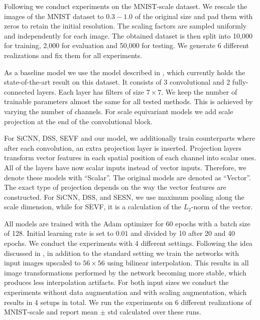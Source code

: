 \documentclass{article} \usepackage{multirow}
\begin{document}
Following \citet{kanazawa2014locally,marcos2018scale,ghosh2019scale} 
we conduct experiments on the MNIST-scale dataset. 
We rescale the images of the MNIST dataset \citet{lecun1998gradient}
to $0.3-1.0$ of the original size and pad them with zeros to retain the initial resolution. 
The scaling factors are sampled uniformly and independently for each image. 
The obtained dataset is then split into 10,000 for training,
2,000 for evaluation and 50,000 for testing. 
We generate 6 different realizations and fix them for all experiments.

As a baseline model we use the model described in \citet{ghosh2019scale},
which currently holds the state-of-the-art result on this dataset. It consists of 
3 convolutional and 2 fully-connected layers. 
Each layer has filters of size $7\times7$. 
We keep the number of trainable parameters almost the same for 
all tested methods. This is achieved by varying the number of channels. For scale equivariant models we add
scale projection at the end of the convolutional block. 

For SiCNN, DSS, SEVF and our model, we additionally train counterparts where after 
each convolution, an extra projection layer is inserted.
Projection layers transform vector features in each spatial position of each channel into scalar ones. All of the layers have now scalar inputs instead of vector inputs. Therefore, we denote these models with ``Scalar''. 
The original models are denoted as ``Vector''. The exact type of projection depends on the way the  
vector features are constructed. For SiCNN, DSS, and SESN, we use maximum pooling along 
the scale dimension, 
while for SEVF, it is a calculation of the $L_2$-norm of the vector. 

All models are trained with the Adam optimizer \citet{kingma2014adam} for 60 epochs with a batch size of 128. 
Initial learning rate is set to $0.01$ and divided by 10 after 20 and 40 epochs. 
We conduct the experiments with 4 different settings. Following the idea discussed 
in \citet{ghosh2019scale}, in addition to the standard setting we train the networks with 
input images upscaled to $56\times56$ using bilinear interpolation. 
This results in all image transformations performed by the network becoming more stable, 
which produces less interpolation artifacts. For both input sizes we conduct the experiments 
without data augmentation 
and with scaling augmentation, which results in 4 setups in total.
We run the experiments on 6 different realizations of MNIST-scale and 
report mean $\pm$ std calculated over these runs.
\end{document}
